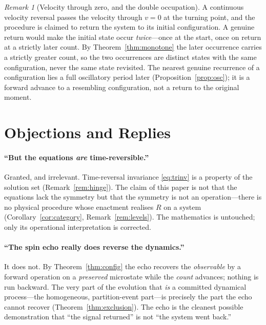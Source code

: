 \documentclass[11pt,a4paper]{article}
\theoremstyle{thmstyle}
\theoremstyle{definition}
\theoremstyle{remark}
\newtheorem{remark}[theorem]{Remark}
\begin{document}
\begin{remark}[Velocity through zero, and the double occupation]
\label{rem:vzero}
A continuous velocity reversal passes the velocity through $v=0$ at the
turning point, and the procedure is claimed to return the system to its
initial configuration. A genuine return would make the initial state
occur \emph{twice}---once at the start, once on return at a strictly
later count. By Theorem~\ref{thm:monotone} the later occurrence carries a
strictly greater count, so the two occurrences are distinct states with
the same configuration, never the same state revisited. The nearest
genuine recurrence of a configuration lies a full oscillatory period
later (Proposition~\ref{prop:osc}); it is a forward advance to a
resembling configuration, not a return to the original moment.
\end{remark}

\section{Objections and Replies}
\label{sec:objections}

\paragraph{``But the equations \emph{are} time-reversible.''}
Granted, and irrelevant. Time-reversal invariance \eqref{eq:trinv} is a
property of the solution set (Remark~\ref{rem:hinge}). The claim of this
paper is not that the equations lack the symmetry but that the symmetry
is not an operation---there is no physical procedure whose enactment
realises $R$ on a system (Corollary~\ref{cor:category},
Remark~\ref{rem:levels}). The mathematics is untouched; only its
operational interpretation is corrected.

\paragraph{``The spin echo really does reverse the dynamics.''}
It does not. By Theorem~\ref{thm:config} the echo recovers the
\emph{observable} by a forward operation on a \emph{preserved} microstate
while the \emph{count} advances; nothing is run backward. The very part
of the evolution that \emph{is} a committed dynamical process---the
homogeneous, partition-event part---is precisely the part the echo
cannot recover (Theorem~\ref{thm:exclusion}). The echo is the cleanest
possible demonstration that ``the signal returned'' is not ``the system
went back.''
\end{document}
